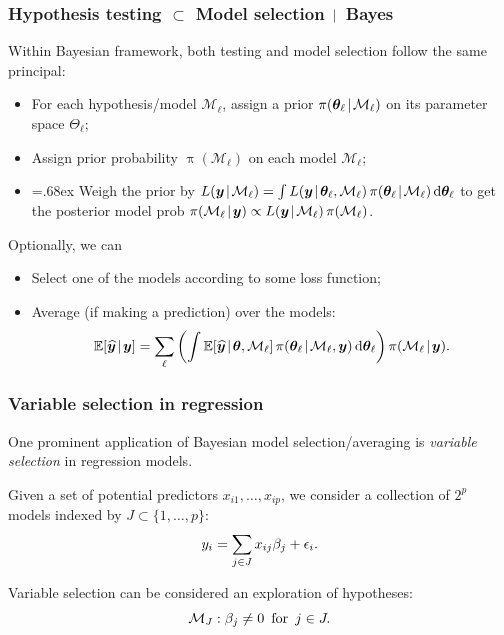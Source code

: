 \documentclass[18pt, handout]{beamer}
\newcommand{\defineTightSpacing}{%
	\setlength{\abovedisplayskip}{.25\baselineskip}%
	\setlength{\belowdisplayskip}{.25\baselineskip}%
}
\newcommand{\given}{\mskip.7\thinmuskip | \mskip.7\thinmuskip}
\newcommand{\diff}{\operatorname{\mathrm{d}}\!{}}
\newcommand{\expectation}{\mathbb{E}}
\newcommand{\nPred}{p}
\newcommand{\density}{\operatorname{\pi}}
\newcommand{\likelihood}{L}
\newcommand{\by}{\bm{y}}
\newcommand{\btheta}{\bm{\theta}}
\newcommand{\model}{\mathcal{M}}
\newcommand{\nonzeroCoefSet}{J}
\begin{document}
\begin{frame}
\frametitle{Hypothesis testing $\subset$ Model selection $\given$ Bayes}
Within Bayesian framework, both testing and model selection follow the same principal:
\vspace*{-.35\baselineskip}
\begin{itemize}
\item For each hypothesis/model $\model_\ell$, assign a prior $\density(\btheta_\ell \given \model_\ell)$ on its parameter space $\Theta_\ell$;
\item Assign prior probability $\density(\model_\ell)$ on each model $\model_\ell$;
\item {\font=.68ex 
	Weigh the prior by $\likelihood(\by \given \model_\ell) = \int \likelihood(\by \given \btheta_\ell, \model_\ell) \density(\btheta_\ell \given \model_\ell) \diff \btheta_\ell$ to get the posterior model prob $\density(\model_\ell \given \by) \propto \likelihood(\by \given \model_\ell) \density(\model_\ell)$.}
\end{itemize}

\vspace*{-.1\baselineskip}
Optionally, we can 
\vspace*{-.35\baselineskip}
\begin{itemize}
\item Select one of the models according to some loss function;
\item Average (if making a prediction) over the models:
	\begin{equation*} \defineTightSpacing%
	\expectation[\widehat{\by} \given \by]
		= \sum_\ell \left( 
			\int \expectation[\widehat{\by} \given \btheta, \model_\ell] 
				\density(\btheta_\ell \given \model_\ell, \by) 
				\diff \btheta_\ell 
			\right)
			\density(\model_\ell \given \by).
	\end{equation*}
\end{itemize}
\end{frame}


\begin{frame}
\frametitle{Variable selection in regression}
One prominent application of Bayesian model selection/averaging is \textit{variable selection} in regression models.

\smallskip
Given a set of potential predictors $x_{i1}, \ldots, x_{i\nPred}$, we consider a collection of $2^\nPred$ models indexed by $\nonzeroCoefSet \subset \{1, \ldots, \nPred\}$:
\begin{equation*} \defineTightSpacing%
y_i = \sum_{j \in \nonzeroCoefSet} x_{ij} \beta_j + \epsilon_i.
\end{equation*}

Variable selection can be considered an exploration of hypotheses:
\begin{equation*} \defineTightSpacing%
\model_\nonzeroCoefSet: \beta_j \neq 0
	\, \text{ for } \, j \in \nonzeroCoefSet.
\end{equation*}
\end{frame}
\end{document}
